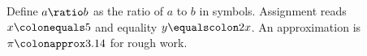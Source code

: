 \documentclass{article}
\begin{document}
Define $a \ratio b$ as the ratio of $a$ to $b$ in symbols.
Assignment reads $x \colonequals 5$ and equality $y \equalscolon 2x$.
An approximation is $\pi \colonapprox 3.14$ for rough work.
\end{document}
